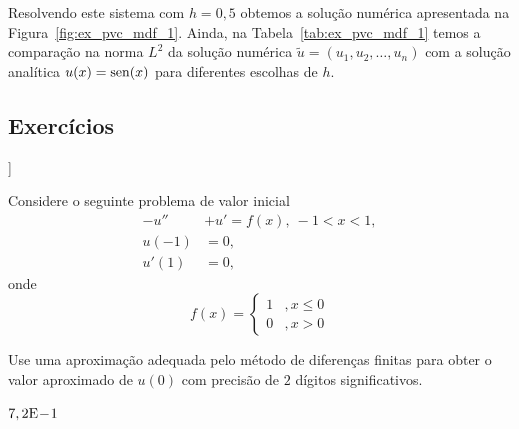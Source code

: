 \begin{ex}
Resolvendo este sistema com $h=0,5$ obtemos a solução numérica apresentada na Figura~\ref{fig:ex_pvc_mdf_1}. Ainda, na Tabela~\ref{tab:ex_pvc_mdf_1} temos a comparação na norma $L^2$ da solução numérica $\tilde{u} = (u_1, u_2, \dotsc, u_n)$ com a solução analítica $u(x)=\operatorname{sen}(x)$ para diferentes escolhas de $h$.









\end{ex}

\subsection*{Exercícios}

\begin{flushleft}
  [[tag:revisar]]
\end{flushleft}

\begin{exer}
Considere o seguinte problema de valor inicial
  \begin{align}
    -u'' &+ u' = f(x),~-1<x<1,\\
    u(-1)&=0,\\
    u'(1)&=0,
  \end{align}
  onde
  \begin{equation}
    f(x) = \left\{
      \begin{array}{ll}
        1 &, x\leq 0\\
        0 &, x>0
      \end{array}
    \right.
  \end{equation}
\end{exer}
Use uma aproximação adequada pelo método de diferenças finitas para obter o valor aproximado de $u(0)$ com precisão de $2$ dígitos significativos.
\begin{resp}
  $7,2\mathrm{E}\!-\!1$
\end{resp}
